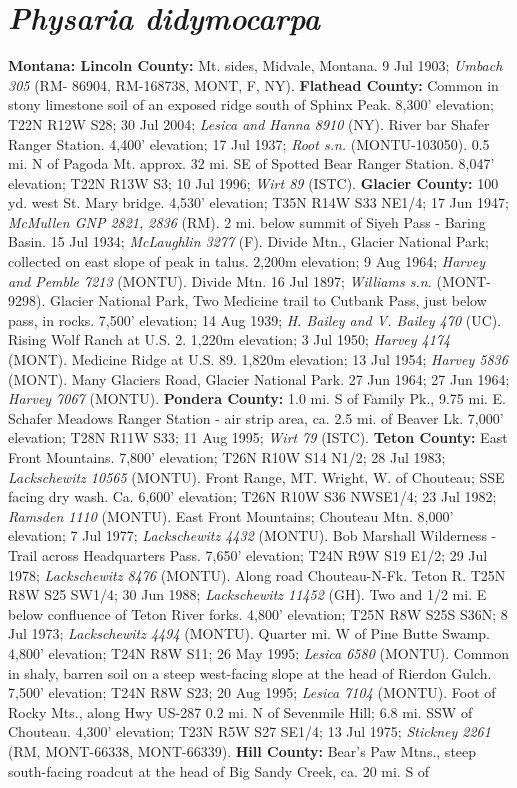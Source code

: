 \section*{\textit{Physaria didymocarpa}}

\textbf{Montana: Lincoln County:}  Mt. sides, Midvale, Montana. 9 Jul 1903; \textit{Umbach 305} (RM- 86904, RM-168738, MONT, F, NY).  \textbf{Flathead County:}  Common in stony limestone soil of an exposed ridge south of Sphinx Peak. 8,300' elevation; T22N R12W S28; 30 Jul 2004; \textit{Lesica and Hanna 8910} (NY).  River bar Shafer Ranger Station. 4,400' elevation; 17 Jul 1937; \textit{Root s.n.} (MONTU-103050).  0.5 mi. N of Pagoda Mt. approx. 32 mi. SE of Spotted Bear Ranger Station. 8,047' elevation; T22N R13W S3; 10 Jul 1996; \textit{Wirt 89} (ISTC).  \textbf{Glacier County:}  100 yd. west St. Mary bridge. 4,530' elevation; T35N R14W S33 NE1/4; 17 Jun 1947; \textit{McMullen GNP 2821, 2836} (RM).  2 mi. below summit of Siyeh Pass - Baring Basin. 15 Jul 1934; \textit{McLaughlin 3277} (F).  Divide Mtn., Glacier National Park; collected on east slope of peak in talus. 2,200m elevation; 9 Aug 1964; \textit{Harvey and Pemble 7213} (MONTU).  Divide Mtn. 16 Jul 1897; \textit{Williams s.n.} (MONT-9298).  Glacier National Park, Two Medicine trail to Cutbank Pass, just below pass, in rocks. 7,500' elevation; 14 Aug 1939; \textit{H. Bailey and V. Bailey 470} (UC).  Rising Wolf Ranch at U.S. 2. 1,220m elevation; 3 Jul 1950; \textit{Harvey 4174} (MONT).  Medicine Ridge at U.S. 89. 1,820m elevation; 13 Jul 1954; \textit{Harvey 5836} (MONT).  Many Glaciers Road, Glacier National Park. 27 Jun 1964; 27 Jun 1964; \textit{Harvey 7067} (MONTU).  \textbf{Pondera County:}  1.0 mi. S of Family Pk., 9.75 mi. E. Schafer Meadows Ranger Station - air strip area, ca. 2.5 mi. of Beaver Lk. 7,000' elevation; T28N R11W S33; 11 Aug 1995; \textit{Wirt 79} (ISTC).  \textbf{Teton County:}  East Front Mountains. 7,800' elevation; T26N R10W S14 N1/2; 28 Jul 1983; \textit{Lackschewitz 10565} (MONTU).  Front Range, MT. Wright, W. of Chouteau; SSE facing dry wash. Ca. 6,600' elevation; T26N R10W S36 NWSE1/4; 23 Jul 1982; \textit{Ramsden 1110} (MONTU).  East Front Mountains; Chouteau Mtn. 8,000' elevation; 7 Jul 1977; \textit{Lackschewitz 4432} (MONTU).  Bob Marshall Wilderness - Trail across Headquarters Pass. 7,650' elevation; T24N R9W S19 E1/2; 29 Jul 1978; \textit{Lackschewitz 8476} (MONTU).  Along road Chouteau-N-Fk. Teton R. T25N R8W S25 SW1/4; 30 Jun 1988; \textit{Lackschewitz 11452} (GH).  Two and 1/2 mi. E below confluence of Teton River forks. 4,800' elevation; T25N R8W S25S S36N; 8 Jul 1973; \textit{Lackschewitz 4494} (MONTU).  Quarter mi. W of Pine Butte Swamp. 4,800' elevation; T24N R8W S11; 26 May 1995; \textit{Lesica 6580} (MONTU).  Common in shaly, barren soil on a steep west-facing slope at the head of Rierdon Gulch. 7,500' elevation; T24N R8W S23; 20 Aug 1995; \textit{Lesica 7104} (MONTU).  Foot of Rocky Mts., along Hwy US-287 0.2 mi. N of Sevenmile Hill; 6.8 mi. SSW of Chouteau. 4,300' elevation; T23N R5W S27 SE1/4; 13 Jul 1975; \textit{Stickney 2261} (RM, MONT-66338, MONT-66339).  \textbf{Hill County:}  Bear's Paw Mtns., steep south-facing roadcut at the head of Big Sandy Creek, ca. 20 mi. S of 